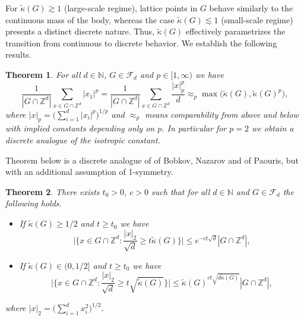 \documentclass[10pt,a4paper]{amsart}
\numberwithin{equation}{section}
\newtheorem{Thm}{Theorem}[section]
\newcommand{\Z}{\mathbb{Z}}
\newcommand{\N}{\mathbb{N}}
\begin{document}
For $\widetilde{\kappa}(G) \gtrsim 1$ (large-scale regime), lattice points in $G$ behave similarly to the continuous mass of the body, whereas the case $\widetilde{\kappa}(G) \lesssim 1$ (small-scale regime) presents a distinct discrete nature. Thus, $\widetilde{\kappa}(G)$ effectively parametrizes the transition from continuous to discrete behavior.
We establish the following results.
\begin{Thm} \label{iso const}
For all $d \in \N$, $G \in \mathcal{F}_d$ and $p \in [1, \infty)$ we have 
\[
\frac{1}{|G \cap \Z^d|} \sum_{x \in G \cap \Z^d} |x_1|^p=\frac{1}{|G \cap \Z^d|} \sum_{x \in G \cap \Z^d} \frac{|x|_p^p}{d} \approx_p \max\Big(\widetilde{\kappa}(G),\widetilde{\kappa}(G)^p \Big),
\]
where $|x|_p=\Big(\sum_{i=1}^d |x_i|^p\Big)^{1/p}$ and $\approx_p$ means comparability from above and below with implied constants depending only on $p$.
In particular for $p=2$ we obtain a discrete analogue of the isotropic constant.
\end{Thm}
Theorem below is a discrete analogue of \cite[Theorem 1.2]{bob-naz} of Bobkov, Nazarov and \cite[Theorem 1.1]{Pa} of Paouris, but with an additional assumption of 1-symmetry.

\begin{Thm} \label{Bobkov-Nazarov main thm}
    There exists $t_0>0$, $c>0$ such that for all $d \in \N$ and $G \in \mathcal{F}_d$ the following holds.
    \begin{itemize}
        \item If $\widetilde{\kappa}(G) \ge 1/2$ and $t \ge t_0$ we have 
    \[
    \Big|\Big\{ x \in G \cap \Z^d: \frac{|x|_2}{\sqrt{d}} \ge t \widetilde{\kappa}(G) \Big\} \Big|  \le e^{-ct \sqrt{d}} |G \cap \Z^d|,
    \]
    \item If $\widetilde{\kappa}(G) \in (0, 1/2]$ and $t \ge t_0$ we have 
    \[
    \Big|\Big\{ x \in G \cap \Z^d: \frac{|x|_2}{\sqrt{d}} \ge t \sqrt{\widetilde{\kappa}(G) } \Big\} \Big|  \le  \widetilde{\kappa}(G)^{ ct\sqrt{d\widetilde{\kappa}(G)}} |G \cap \Z^d|,
    \]
    \end{itemize}
    where $|x|_2=\Big(\sum_{i=1}^d x_i^2\Big)^{1/2}.$
\end{Thm}
\end{document}
